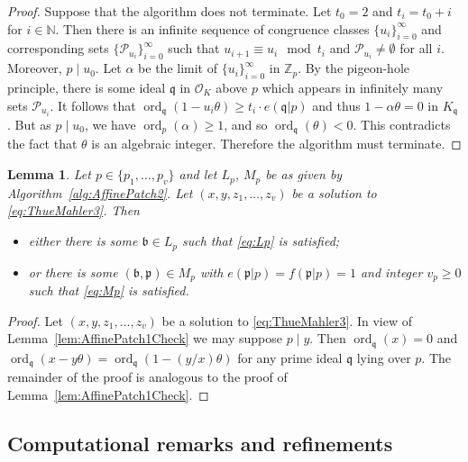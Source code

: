 \documentclass[11pt]{report}
\newtheorem{lemma}[theorem]{Lemma}
\theoremstyle{definition}
\DeclareMathOperator{\ord}{ord}
\begin{document}
\begin{proof}
Suppose that the algorithm does not terminate. Let $t_0=2$ and $t_i=t_0+i$ for $i \in \mathbb{N}$. Then there is an infinite sequence of congruence classes $\{u_i\}_{i = 0}^{\infty}$ and corresponding sets $\{\mathcal{P}_{u_i}\}_{i=0}^{\infty}$ such that $u_{i+1} \equiv u_i \mod{t_i}$ and $\mathcal{P}_{u_i} \ne \emptyset$ for all $i$. Moreover, $p \mid u_0$. Let $\alpha$ be the limit of $\{u_i\}_{i=0}^{\infty}$ in $\mathbb{Z}_p$. By the pigeon-hole principle, there is some ideal $\mathfrak{q}$ in $\mathcal{O}_K$ above $p$ which appears in infinitely many sets $\mathcal{P}_{u_i}$. It follows that $\ord_{\mathfrak{q}}(1 -u_i \theta) \ge t_i \cdot e(\mathfrak{q}|p)$ and thus $1-\alpha \theta=0$ in $K_{\mathfrak{q}}$. But as $p \mid u_0$, we have $\ord_p(\alpha) \ge 1$, and so $\ord_{\mathfrak{q}}(\theta)<0$. This contradicts the fact that $\theta$ is an algebraic integer. Therefore the algorithm must terminate.
\end{proof}

\begin{lemma}\label{lem:AffinePatch2Check}
Let $p \in \{p_1, \dots, p_v\}$ and let $L_p$, $M_p$ be as given by Algorithm~\ref{alg:AffinePatch2}. Let $(x,y,z_1,\dots, z_v)$ be a solution to \eqref{eq:ThueMahler3}. Then
\begin{itemize}
\item either there is some $\mathfrak{b} \in L_p$ such that \eqref{eq:Lp} is satisfied;
\item or there is some $(\mathfrak{b},\mathfrak{p}) \in M_p$ with $e(\mathfrak{p}|p)=f(\mathfrak{p}|p)=1$ and integer $v_p \geq 0$ such that \eqref{eq:Mp} is satisfied.
\end{itemize}
\end{lemma}

\begin{proof}
Let $(x,y,z_1,\dots, z_v)$ be a solution to \eqref{eq:ThueMahler3}. In view of Lemma~\ref{lem:AffinePatch1Check} we may suppose $p \mid y$. Then $\ord_{\mathfrak{q}}(x) = 0$ and $\ord_{\mathfrak{q}}(x-y\theta)=\ord_{\mathfrak{q}}(1 - (y/x) \theta)$ for any prime ideal $\mathfrak{q}$ lying over $p$. The remainder of the proof is analogous to the proof of Lemma~\ref{lem:AffinePatch1Check}.
\end{proof}


\subsection{Computational remarks and refinements}
\label{subsec:PIRLRemarks}
\end{document}
